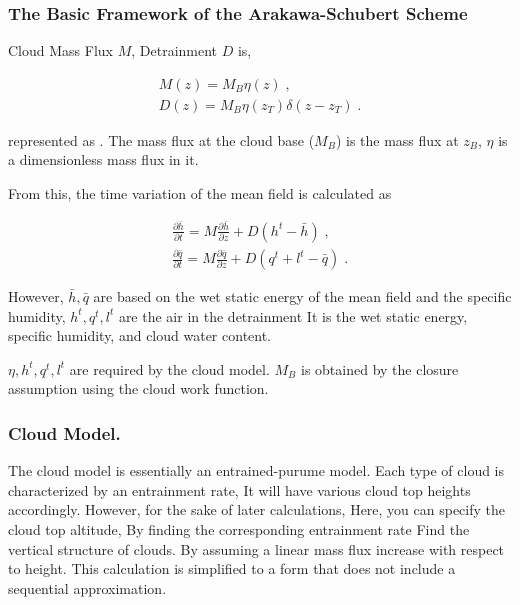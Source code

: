 \hypertarget{the-basic-framework-of-the-arakawa-schubert-scheme}{%
\subsubsection{The Basic Framework of the Arakawa-Schubert
Scheme}\label{the-basic-framework-of-the-arakawa-schubert-scheme}}

Cloud Mass Flux \(M\), Detrainment \(D\) is,

\begin{eqnarray}
  M(z)     =  M_B \eta(z) \; , \\
  D(z)     =  M_B \eta(z_T) \delta (z-z_T) \; .
\end{eqnarray}

represented as . The mass flux at the cloud base (\(M_B\)) is the mass
flux at \(z_B\), \(\eta\) is a dimensionless mass flux in it.

From this, the time variation of the mean field is calculated as

\begin{eqnarray}
  \frac{\partial \bar{h}}{\partial t}  =  M \frac{\partial \bar{h}}{\partial z} 
                       + D( h^t - \bar{h} ) \; , \\
  \frac{\partial \bar{q}}{\partial t}  =  M\frac{\partial \bar{q}}{\partial z} 
                       + D( q^t + l^t - \bar{q} ) \; .
\end{eqnarray}

However, \(\bar{h}, \bar{q}\) are based on the wet static energy of the
mean field and the specific humidity, \(h^t, q^t, l^t\) are the air in
the detrainment It is the wet static energy, specific humidity, and
cloud water content.

\(\eta, h^t, q^t, l^t\) are required by the cloud model. \(M_B\) is
obtained by the closure assumption using the cloud work function.

\hypertarget{cloud-model.}{%
\subsubsection{Cloud Model.}\label{cloud-model.}}

The cloud model is essentially an entrained-purume model. Each type of
cloud is characterized by an entrainment rate, It will have various
cloud top heights accordingly. However, for the sake of later
calculations, Here, you can specify the cloud top altitude, By finding
the corresponding entrainment rate Find the vertical structure of
clouds. By assuming a linear mass flux increase with respect to height.
This calculation is simplified to a form that does not include a
sequential approximation.

